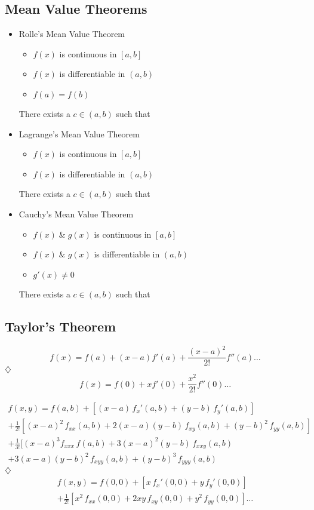 \documentclass[12pt]{article}
\begin{document}
\subsection{Mean Value Theorems}
\begin{itemize}
\item Rolle's Mean Value Theorem
\begin{itemize}
\item $f(x)$ is continuous in $[a,b]$
\item $f(x)$ is differentiable in $(a,b)$
\item $f(a)=f(b)$
\end{itemize}
There exists a $c\in(a,b)$ such that 

\item Lagrange's Mean Value Theorem
\begin{itemize}
\item $f(x)$ is continuous in $[a,b]$
\item $f(x)$ is differentiable in $(a,b)$
\end{itemize}
There exists a $c\in(a,b)$ such that 

\item Cauchy's Mean Value Theorem
\begin{itemize}
\item $f(x)\;\&\;g(x)$ is continuous in $[a,b]$
\item $f(x)\;\&\;g(x)$ is differentiable in $(a,b)$
\item $g'(x) \neq 0$
\end{itemize}
There exists a $c\in(a,b)$ such that 
\end{itemize}

\subsection{Taylor's Theorem}

\[f(x)=f(a)+(x-a)f'(a)+\frac{(x-a)^2}{2!}f''(a)\dots\]
$\diamondsuit$ 
\[f(x)=f(0)+xf'(0)+\frac{x^2}{2!}f''(0)\dots\]

\begin{align*}
f(x,y)=f(a,b)+\left[(x-a)\,f_x'(a,b)+(y-b)\,f_y'(a,b)\right]\\
+\frac{1}{2!}\left[(x-a)^2\,f_{xx}(a,b)+2(x-a)(y-b)\,f_{xy}(a,b)+(y-b)^2\,f_{yy}(a,b)\right]\\
+\frac{1}{3!}[(x-a)^3f_{xxx}\,f(a,b)+3(x-a)^2(y-b)\,f_{xxy}(a,b)\\
+3(x-a)(y-b)^2\,f_{xyy}(a,b)+(y-b)^3\,f_{yyy}(a,b)
\end{align*}
$\diamondsuit$ 
\begin{align*}
f(x,y)=f(0,0)+\left[x\,f_x'(0,0)+y\,f_y'(0,0)\right]\\
+\frac{1}{2!}\left[x^2\,f_{xx}(0,0)+2xy\,f_{xy}(0,0)+y^2\,f_{yy}(0,0)\right]\dots
\end{align*}
\end{document}
